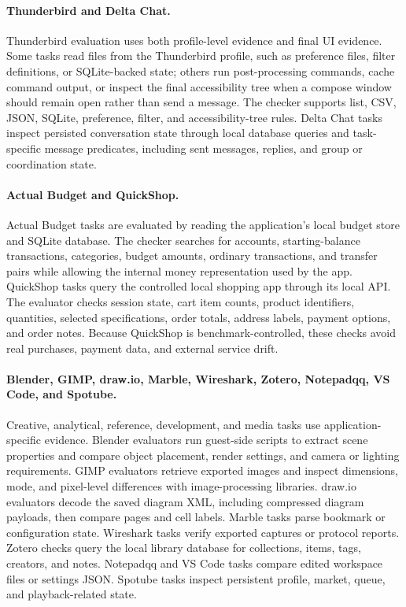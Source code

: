 \paragraph{Thunderbird and Delta Chat.}
Thunderbird evaluation uses both profile-level evidence and final UI evidence. Some tasks read files from the Thunderbird profile, such as preference files, filter definitions, or SQLite-backed state; others run post-processing commands, cache command output, or inspect the final accessibility tree when a compose window should remain open rather than send a message. The checker supports list, CSV, JSON, SQLite, preference, filter, and accessibility-tree rules. Delta Chat tasks inspect persisted conversation state through local database queries and task-specific message predicates, including sent messages, replies, and group or coordination state.

\paragraph{Actual Budget and QuickShop.}
Actual Budget tasks are evaluated by reading the application's local budget store and SQLite database. The checker searches for accounts, starting-balance transactions, categories, budget amounts, ordinary transactions, and transfer pairs while allowing the internal money representation used by the app. QuickShop tasks query the controlled local shopping app through its local API. The evaluator checks session state, cart item counts, product identifiers, quantities, selected specifications, order totals, address labels, payment options, and order notes. Because QuickShop is benchmark-controlled, these checks avoid real purchases, payment data, and external service drift.

\paragraph{Blender, GIMP, draw.io, Marble, Wireshark, Zotero, Notepadqq, VS Code, and Spotube.}
Creative, analytical, reference, development, and media tasks use application-specific evidence. Blender evaluators run guest-side scripts to extract scene properties and compare object placement, render settings, and camera or lighting requirements. GIMP evaluators retrieve exported images and inspect dimensions, mode, and pixel-level differences with image-processing libraries. draw.io evaluators decode the saved diagram XML, including compressed diagram payloads, then compare pages and cell labels. Marble tasks parse bookmark or configuration state. Wireshark tasks verify exported captures or protocol reports. Zotero checks query the local library database for collections, items, tags, creators, and notes. Notepadqq and VS Code tasks compare edited workspace files or settings JSON. Spotube tasks inspect persistent profile, market, queue, and playback-related state.

